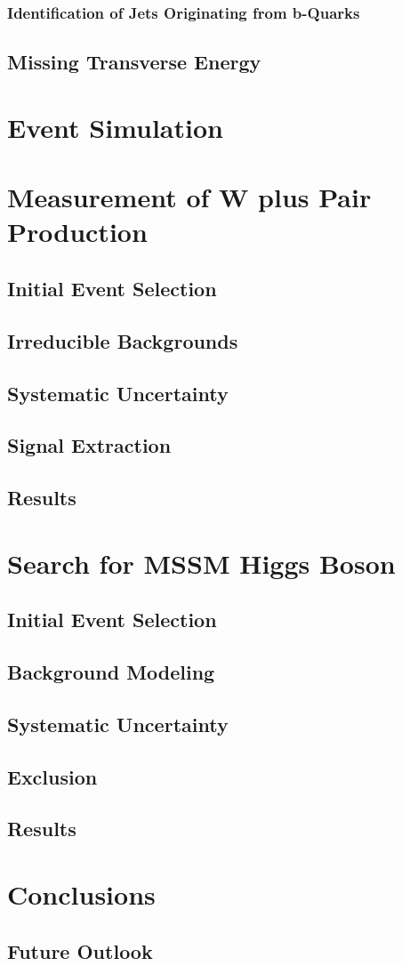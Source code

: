 \documentclass[oneside, letterpaper, 12pt, oldfontcommands]{memoir}
\begin{document}
\subsection{Identification of Jets Originating from b-Quarks}
\section{Missing Transverse Energy}

\chapter{Event Simulation}

\chapter{Measurement of W plus \bbbar Pair Production}
\section{Initial Event Selection}
\section{Irreducible Backgrounds}
\section{Systematic Uncertainty}
\section{Signal Extraction}
\section{Results}

\chapter{Search for MSSM Higgs Boson}
\section{Initial Event Selection}
\section{Background Modeling}
\section{Systematic Uncertainty}
\section{Exclusion}
\section{Results}


\chapter{Conclusions}
\section{Future Outlook}
\end{document}
